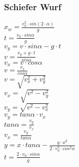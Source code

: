 \subsubsection{Schiefer Wurf} 
\begin{minipage}{0.45\textwidth} 
$ x_{w}  = \frac{v_{0} ^{2} \cdot sin(2\cdot \alpha )}{       g} $\\ 
$ t =\frac{v_{0} \cdot sin \alpha }{  g} $\\ 
$ v_{y}  =  v\cdot sin\alpha - g\cdot t $\\ 
$ v= \frac{ v_{y} +g\cdot t}{ sin\alpha } $\\ 
$ v_{x}  = v\cdot  cos\alpha $\\ 
$ v= \frac{ v_{x} }{ cos\alpha } $\\ 
$ v= \sqrt{ v_{x} ^{2} + v_{y} ^{2} } $\\ 
$ v_{x} = \sqrt{ v^{2}  - v_{y} ^{2} } $\\ 
$ v_{y} = \sqrt{ v^{2}  - v_{x} ^{2} } $\\ 
$ v_{y} = tan \alpha \cdot  v_{x} $\\ 
$ tan \alpha = \frac{v_{y} }{v_{x} } $\\ 
$ v_{x} = \frac{v_{y} }{tan \alpha } $\\ 
$ y = x\cdot tan \alpha  - \frac{   g\cdot x^{2} }{2\cdot v^{2} _{0} \cdot cos ^{2}\alpha } $\\ 
$ t =\frac{2\cdot v_{0} \cdot sin \alpha }{ g} $\\ 
\end{minipage} 
\begin{minipage}{0.45\textwidth} 
 
\end{minipage} 
